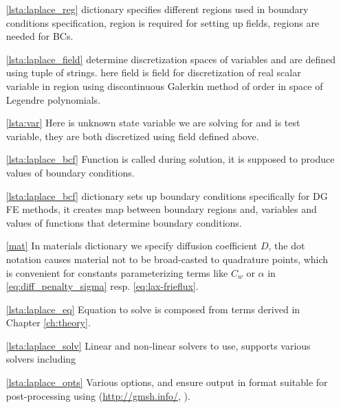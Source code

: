 \begin{itemize}
  \item[\ref{lsta:laplace_reg}]  dictionary 
  specifies different regions used in boundary conditions specification,  
  region is required for setting up fields,  regions are needed for BCs.
  \item[\ref{lsta:laplace_field}]   determine 
  discretization spaces of variables and are defined using tuple of strings.
   here field  is field for discretization of real scalar 
  variable in region  using discontinuous Galerkin method of order 
   in space of Legendre polynomials. 
  \item[\ref{lsta:var}]  Here  is unknown state variable we are solving for 
  and  is test variable, they are both discretized using field  
  defined above.
  \item[\ref{lsta:laplace_bcf}]  Function  is called during solution, it is 
  supposed to produce values of boundary conditions.
  \item[\ref{lsta:laplace_bcf}]  dictionary sets up boundary 
  conditions specifically for DG FE methods, it creates map between 
  boundary regions and, variables and values of functions that determine boundary  
  conditions.
  \item[\ref{mat}] In materials dictionary we specify diffusion coefficient $D$, the dot 
  notation  causes material not to be broad-casted to quadrature points, 
  which is convenient for constants parameterizing terms like $C_w$ or $\alpha$ in 
  \eqref{eq:diff_penalty_sigma} resp. \eqref{eq:lax-frieflux}.
  \item[\ref{lsta:laplace_eq}] Equation to solve is composed from terms derived in 
  Chapter \ref{ch:theory}.
  \item[\ref{lsta:laplace_solv}] Linear and non-linear solvers to use, \sfepy{} supports 
  various solvers including  \cite{MUMPS:2}
  \item[\ref{lsta:laplace_opts}] Various options,  and 
   ensure output in format suitable for 
  post-processing using  (\url{http://gmsh.info/}, \cite{Remacle2007}).
\end{itemize}


